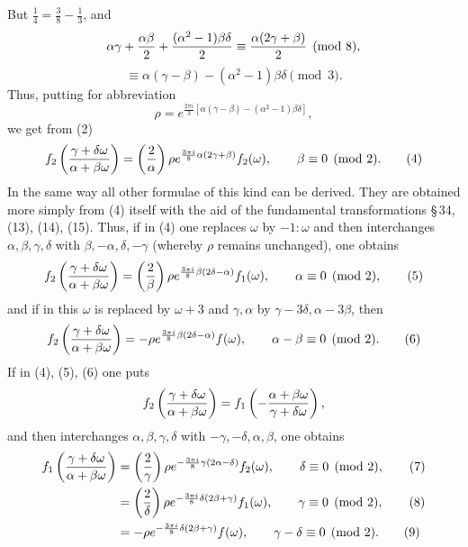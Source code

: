 \documentclass[11pt]{article}
\providecommand{\Jac}[2]{\left(\frac{#1}{#2}\right)}
\begin{document}
But $\frac14=\frac38-\frac13$, and
\[
\alpha\gamma+{\alpha\beta\over2}+{(\alpha^2-1)\beta\delta\over2}
\equiv {\alpha(2\gamma+
\beta)\over2}\pmod 8,
\]
\[
\equiv \alpha(\gamma-\beta)-(\alpha^2-1)\beta\delta\pmod 3.
\]
Thus, putting for abbreviation
\begin{equation}
\rho=e^{\frac{2\pi i}{3}[\alpha(\gamma-\beta)-(\alpha^2-1)\beta\delta]},
\tag{3}
\end{equation}
we get from (2)
\begin{equation}
f_2\left({\gamma+
\delta\omega\over\alpha+
\beta\omega}\right)
=\Jac{2}{\alpha}\rho e^{\frac{3\pi i}{8}\alpha(2\gamma+
\beta)}f_2(\omega),
\qquad \beta\equiv0\pmod2. 
\tag{4}
\end{equation}
In the same way all other formulae of this kind can be derived. They are obtained more simply from (4) itself with the aid of the fundamental transformations \S\,34, (13), (14), (15). Thus, if in (4) one replaces $\omega$ by $-1:\omega$ and then interchanges $\alpha,\beta,\gamma,\delta$ with $\beta,-\alpha,\delta,-\gamma$ (whereby $\rho$ remains unchanged), one obtains
\begin{equation}
f_2\left({\gamma+
\delta\omega\over\alpha+
\beta\omega}\right)
=\Jac{2}{\beta}\rho e^{\frac{3\pi i}{8}\beta(2\delta-
\alpha)}f_1(\omega),
\qquad \alpha\equiv0\pmod2,
\tag{5}
\end{equation}
and if in this $\omega$ is replaced by $\omega+3$ and $\gamma,
\alpha$ by $\gamma-3\delta,
\alpha-3\beta$, then
\begin{equation}
f_2\left({\gamma+
\delta\omega\over\alpha+
\beta\omega}\right)
=-\rho e^{\frac{3\pi i}{8}\beta(2\delta-
\alpha)}f(\omega),
\qquad \alpha-
\beta\equiv0\pmod2. 
\tag{6}
\end{equation}
If in (4), (5), (6) one puts
\[
f_2\left({\gamma+
\delta\omega\over\alpha+
\beta\omega}\right)
=f_1\left(-{\alpha+
\beta\omega\over\gamma+
\delta\omega}\right),
\]
and then interchanges $\alpha,\beta,\gamma,\delta$ with $-\gamma,-\delta,\alpha,\beta$, one obtains
\begin{align}
f_1\left({\gamma+
\delta\omega\over\alpha+
\beta\omega}\right)
&=\Jac{2}{\gamma}\rho e^{-\frac{3\pi i}{8}\gamma(2\alpha-
\delta)}f_2(\omega),
\qquad \delta\equiv0\pmod2, \tag{7}\\
&=\Jac{2}{\delta}\rho e^{-\frac{3\pi i}{8}\delta(2\beta+
\gamma)}f_1(\omega),
\qquad \gamma\equiv0\pmod2, \tag{8}\\
&=-\rho e^{-\frac{3\pi i}{8}\delta(2\beta+
\gamma)}f(\omega),
\qquad \gamma-
\delta\equiv0\pmod2. \tag{9}
\end{align}
\end{document}
